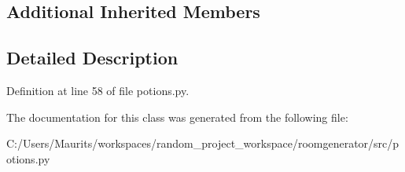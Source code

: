 \subsection*{Additional Inherited Members}


\subsection{Detailed Description}


Definition at line 58 of file potions.\+py.



The documentation for this class was generated from the following file\+:\begin{DoxyCompactItemize}
\item 
C\+:/\+Users/\+Maurits/workspaces/random\+\_\+project\+\_\+workspace/roomgenerator/src/potions.\+py\end{DoxyCompactItemize}
